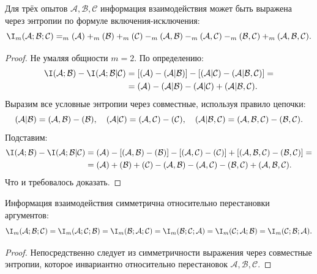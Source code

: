 \begin{proposition}
	Для трёх опытов $\mathcal{A},\mathcal{B},\mathcal{C}$ информация взаимодействия может быть выражена через энтропии по формуле включения-исключения:
	\[
		\I_m(\mathcal{A};\mathcal{B};\mathcal{C}) = \H_m(\mathcal{A}) + \H_m(\mathcal{B}) + \H_m(\mathcal{C}) - \H_m(\mathcal{A},\mathcal{B}) - \H_m(\mathcal{A},\mathcal{C}) - \H_m(\mathcal{B},\mathcal{C}) + \H_m(\mathcal{A},\mathcal{B},\mathcal{C}).
	\]
\end{proposition}
\begin{proof}
	Не умаляя общности $m = 2$. По определению:	
	\begin{align*}
		\I(\mathcal{A};\mathcal{B}) - \I(\mathcal{A};\mathcal{B}|\mathcal{C}) 
		&= [\H(\mathcal{A}) - \H(\mathcal{A}|\mathcal{B})] - [\H(\mathcal{A}|\mathcal{C}) - \H(\mathcal{A}|\mathcal{B},\mathcal{C})] =\\
		&= \H(\mathcal{A}) - \H(\mathcal{A}|\mathcal{B}) - \H(\mathcal{A}|\mathcal{C}) + \H(\mathcal{A}|\mathcal{B},\mathcal{C}).
	\end{align*}
	Выразим все условные энтропии через совместные, используя правило цепочки:
	\[
		\relax(\mathcal{A}|\mathcal{B}) = \relax(\mathcal{A},\mathcal{B}) - \relax(\mathcal{B}),\quad
		\relax(\mathcal{A}|\mathcal{C}) = \relax(\mathcal{A},\mathcal{C}) - \relax(\mathcal{C}),\quad
		\relax(\mathcal{A}|\mathcal{B},\mathcal{C}) = \relax(\mathcal{A},\mathcal{B},\mathcal{C}) - \relax(\mathcal{B},\mathcal{C}).
	\]
	Подставим:
	\begin{align*}
		\I(\mathcal{A};\mathcal{B}) - \I(\mathcal{A};\mathcal{B}|\mathcal{C}) &= \H(\mathcal{A}) - [\H(\mathcal{A},\mathcal{B}) - \H(\mathcal{B})] - [\H(\mathcal{A},\mathcal{C}) - \H(\mathcal{C})] + [\H(\mathcal{A},\mathcal{B},\mathcal{C}) - \H(\mathcal{B},\mathcal{C})] =\\
		&= \H(\mathcal{A}) + \H(\mathcal{B}) + \H(\mathcal{C}) - \H(\mathcal{A},\mathcal{B}) - \H(\mathcal{A},\mathcal{C}) - \H(\mathcal{B},\mathcal{C}) + \H(\mathcal{A},\mathcal{B},\mathcal{C}).
	\end{align*}
	Что и требовалось доказать.
\end{proof}

\begin{corollary}[Симметричность]
	Информация взаимодействия симметрична относительно перестановки аргументов:
	\[
		\I_m(\mathcal{A};\mathcal{B};\mathcal{C}) = \I_m(\mathcal{A};\mathcal{C};\mathcal{B}) = \I_m(\mathcal{B};\mathcal{A};\mathcal{C}) 
		= \I_m(\mathcal{B};\mathcal{C};\mathcal{A}) = \I_m(\mathcal{C};\mathcal{A};\mathcal{B}) = \I_m(\mathcal{C};\mathcal{B};\mathcal{A}).
	\]
\end{corollary}
\begin{proof}
	Непосредственно следует из симметричности выражения через совместные энтропии, которое инвариантно относительно перестановок $\mathcal{A}, \mathcal{B}, \mathcal{C}$.
\end{proof}

